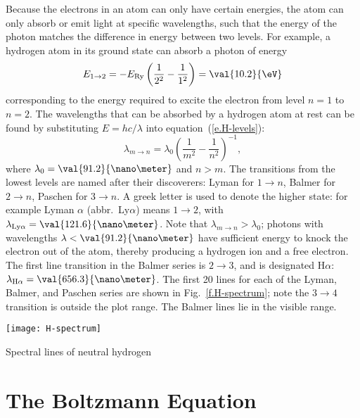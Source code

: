 Because the electrons in an atom can only have certain energies, the atom can only absorb or emit light at specific wavelengths, such that the energy of the photon matches the difference in energy between two levels. For example, a hydrogen atom in its ground state can absorb a photon of energy
\[
        E_{1\to2} = -\ERy \left(\frac{1}{2^{2}} - \frac{1}{1^{2}}\right)
                 = \val{10.2}{\eV}
\]
corresponding to the energy required to excite the electron from level $n=1$ to $n=2$. The wavelengths that can be absorbed by a hydrogen atom at rest can be found by substituting $E = hc/\lambda$ into equation~(\ref{e.H-levels}):
\begin{equation}
        \lambda_{m\to n} = \lambda_{0}\left(\frac{1}{m^{2}}-\frac{1}{n^{2}}\right)^{-1},
\end{equation}
where $\lambda_{0} = \val{91.2}{\nano\meter}$ and $n > m$.
The transitions from the lowest levels are named after their discoverers: Lyman for $1\to n$, Balmer for $2\to n$, Paschen for $3\to n$. A greek letter is used to denote the higher state: for example Lyman $\alpha$ (abbr.\ Ly$\alpha$) means $1\to2$, with $\lambda_{\mathrm{Ly}\alpha} = \val{121.6}{\nano\meter}$. Note that $\lambda_{m\to n} > \lambda_{0}$; photons with wavelengths $\lambda < \val{91.2}{\nano\meter}$ have sufficient energy to knock the electron out of the atom, thereby producing a hydrogen ion and a free electron. The first line transition in the Balmer series is $2\to3$, and is designated H$\alpha$: $\lambda_{\mathrm{H}\alpha} = \val{656.3}{\nano\meter}$. The first 20 lines for each of the Lyman, Balmer, and Paschen series are shown in Fig.~\ref{f.H-spectrum}; note the $3\to4$ transition is outside the plot range. The Balmer lines lie in the visible range.

\begin{marginfigure}
\texttt{[image: H-spectrum]}
\caption{Spectral lines of neutral hydrogen 
\label{f.H-spectrum}}
\end{marginfigure}

\section{The Boltzmann Equation}
\label{s.boltzmann-eqn}

